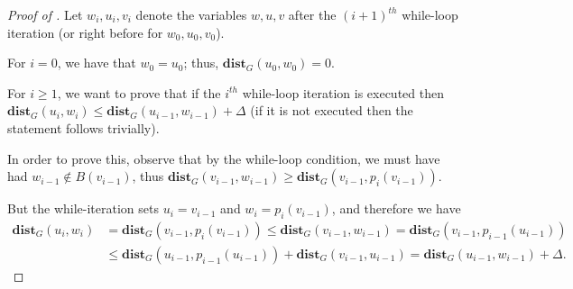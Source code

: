 \begin{proof}[Proof of ]
Let $w_i, u_i, v_i$ denote the variables $w,u,v$ after the $(i+1)^{th}$ while-loop iteration (or right before for $w_0,u_0,v_0$).

For $i = 0$, we have that $w_0 = u_0$; thus, $\mathbf{dist}_G(u_0,w_0) = 0$.

For $i \geq 1$, we want to prove that if the $i^{th}$ while-loop iteration is executed then $\mathbf{dist}_G(u_i,w_i) \leq \mathbf{dist}_G(u_{i-1},w_{i-1}) + \Delta$ (if it is not executed then the statement follows trivially).

In order to prove this, observe that by the while-loop condition, we must have had $w_{i-1} \not\in B(v_{i-1})$, thus  $\mathbf{dist}_G(v_{i-1}, w_{i-1}) \geq \mathbf{dist}_G(v_{i-1}, p_i(v_{i-1}))$.

But the while-iteration sets $u_i = v_{i-1}$ and $w_i = p_i(v_{i-1})$, and therefore we have
\begin{align*}
\mathbf{dist}_G(u_{i}, w_i) &= \mathbf{dist}_G(v_{i-1}, p_i(v_{i-1})) \leq
\mathbf{dist}_G(v_{i-1}, w_{i-1}) = \mathbf{dist}_G(v_{i-1}, p_{i-1}(u_{i-1})) \\
&\leq \mathbf{dist}_G(u_{i-1}, p_{i-1}(u_{i-1})) + \mathbf{dist}_G(v_{i-1}, u_{i-1}) = \mathbf{dist}_G(u_{i-1}, w_{i-1}) + \Delta.
\end{align*}
\end{proof}
